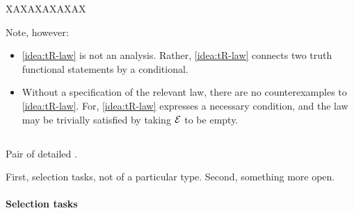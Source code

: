 \begin{note}
  {
    \color{red}
    XAXAXAXAXAX
  }

  Note, however:

  \begin{itemize}[noitemsep]
  \item
    \autoref{idea:tR-law} is not an analysis.
    Rather, \autoref{idea:tR-law} connects two truth functional statements by a conditional.
  \item
    Without a specification of the relevant law, there are no counterexamples to \autoref{idea:tR-law}.
    For, \autoref{idea:tR-law} expresses a necessary condition, and the law may be trivially satisfied by taking \({\cal E}\) to be empty.
  \end{itemize}
\end{note}

\subsection{}
\label{sec:illu3-1}

\begin{note}
  Pair of detailed .

  First, selection tasks, not \tC{} of a particular type.
  Second, something more open.
\end{note}

\paragraph*{Selection tasks}
\nocite{Wason:1968aa}
\nocite{Wason:1971aa}
\label{par:selection-tasks}


